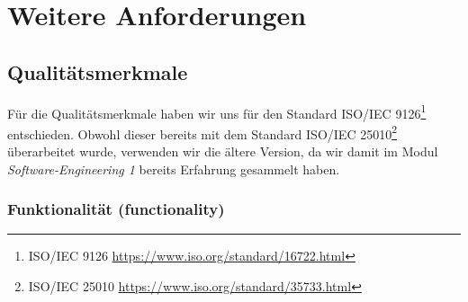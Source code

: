 \documentclass[a4paper]{article}
\let\oldsection\section
\renewcommand\section{\clearpage\oldsection}
\begin{document}
\pagebreak
\section{Weitere Anforderungen}

\subsection{Qualitätsmerkmale}

\newcommand{\isourl}[2]{ISO/IEC #1\footnote{ISO/IEC #1 \url{https://www.iso.org/standard/#2.html}}}

Für die Qualitätsmerkmale haben wir uns für den Standard \isourl{9126}{16722} entschieden. Obwohl dieser bereits mit dem Standard \isourl{25010}{35733} überarbeitet wurde, verwenden wir die ältere Version, da wir damit im Modul \emph{Software-Engineering 1} bereits Erfahrung gesammelt haben.

\subsubsection{Funktionalität (functionality)}
\end{document}
